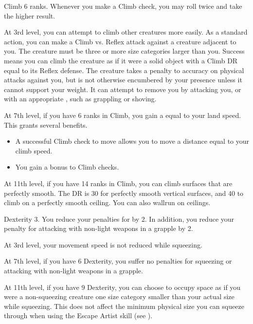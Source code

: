     \featpre Climb 6 ranks.
    \featben Whenever you make a Climb check, you may roll twice and take the higher result.

    At 3rd level, you can attempt to climb other creatures more easily.
    As a standard action, you can make a Climb vs. Reflex attack against a creature adjacent to you.
    The creature must be three or more size categories larger than you.
    Success means you can climb the creature as if it were a solid object with a Climb DR equal to its Reflex defense.
    The creature takes a  penalty to accuracy on physical attacks against you, but is not otherwise encumbered by your presence unless it cannot support your weight.
    It can attempt to remove you by attacking you, or with an appropriate , such as grappling or shoving.

    At 7th level, if you have 6 ranks in Climb, you gain a  equal to your land speed.
    This grants several benefits.
    \begin{itemize}
        \item A successful Climb check to move allows you to move a distance equal to your climb speed.
        \item You gain a  bonus to Climb checks.
    \end{itemize}

    At 11th level, if you have 14 ranks in Climb, you can climb surfaces that are perfectly smooth.
    The DR is 30 for perfectly smooth vertical surfaces, and 40 to climb on a perfectly smooth ceiling.
    You can also wallrun on ceilings.

    \featpre Dexterity 3.
    \featben You reduce your penalties for  by 2. In addition, you reduce your penalty for attacking with non-light weapons in a grapple by 2.

    At 3rd level, your movement speed is not reduced while squeezing.

    At 7th level, if you have 6 Dexterity, you suffer no penalties for squeezing or attacking with non-light weapons in a grapple.

    At 11th level, if you have 9 Dexterity, you can choose to occupy space as if you were a non-squeezing creature one size category smaller than your actual size while squeezing.
    This does not affect the minimum physical size you can squeeze through when using the Escape Artist skill (see ).

